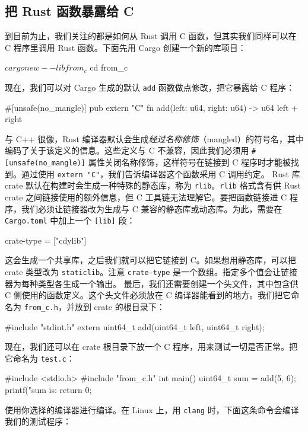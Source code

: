 \subsection{把 Rust 函数暴露给 C}
\label{idx:idx_3db74c77}
到目前为止，我们关注的都是如何从 Rust 调用 C 函数，但其实我们同样可以在 C 程序里调用 Rust 函数。下面先用 Cargo 创建一个新的库项目：
\begin{codeboxdark}
$ cargo new --lib from_c
$ cd from_c
\end{codeboxdark}
现在，我们可以对 Cargo 生成的默认 \texttt{add} 函数做点修改，把它暴露给 C 程序：
\begin{codebox}[rust]
#[unsafe(no_mangle)]
pub extern "C" fn add(left: u64, right: u64) -> u64 {
    left + right
}
\end{codebox}
与 C++ 很像，Rust 编译器默认会生成\emph{经过名称修饰}（mangled）的符号名，其中编码了关于该定义的信息。这些定义与 C 不兼容，因此我们必须用 \texttt{\#[\allowbreak{}unsafe(\allowbreak{}no\_\allowbreak{}mangle)\allowbreak{}]\allowbreak{}} 属性关闭名称修饰，这样符号在链接到 C 程序时才能被找到。通过使用 \texttt{extern "C"}，我们告诉编译器这个函数采用 C 调用约定。
\label{idx:idx_9670bdcb}
Rust 库 crate 默认在构建时会生成一种特殊的静态库，称为 \texttt{rlib}。\texttt{rlib} 格式含有供 Rust crate 之间链接使用的额外信息，但 C 工具链无法理解它。要把函数链接进 C 程序，我们必须让链接器改为生成与 C 兼容的静态库或动态库。为此，需要在 \texttt{Cargo.toml} 中加上一个 \texttt{[lib]} 段：
\begin{codebox}[rust]
[lib]
crate-type = ["cdylib"]
\end{codebox}
这会生成一个共享库，之后我们就可以把它链接到 C。如果想用静态库，可以把 crate 类型改为 \texttt{staticlib}。注意 \texttt{crate-type} 是一个数组。指定多个值会让链接器为每种类型各生成一个输出。
最后，我们还需要创建一个头文件，其中包含供 C 侧使用的函数定义。这个头文件必须放在 C 编译器能看到的地方。我们把它命名为 \texttt{from\_c.h}，并放到 crate 的根目录下：
\begin{codebox}[text]
#include "stdint.h"
extern uint64_t add(uint64_t left, uint64_t right);
\end{codebox}
现在，我们还可以在 crate 根目录下放一个 C 程序，用来测试一切是否正常。把它命名为 \texttt{test.c}：
\begin{codebox}[text]
#include <stdio.h>
#include "from_c.h"
int main() {
  uint64_t sum = add(5, 6);
  printf("sum is: %
  return 0;
}
\end{codebox}
\label{idx:idx_0d227dca}
使用你选择的编译器进行编译。在 Linux 上，用 \texttt{clang} 时，下面这条命令会编译我们的测试程序：
